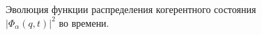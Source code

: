 \begin{figure}
\centering



\caption{Эволюция функции распределения когерентного состояния
  $\left|\Phi_{\alpha}\left(q,t\right)\right|^2$ во времени.} 
\label{figQCoh_1}
\end{figure}
